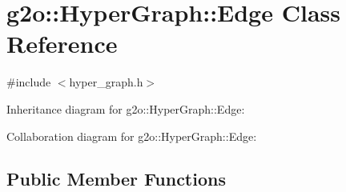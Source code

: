 \hypertarget{classg2o_1_1HyperGraph_1_1Edge}{}\section{g2o\+:\+:Hyper\+Graph\+:\+:Edge Class Reference}
\label{classg2o_1_1HyperGraph_1_1Edge}


{\ttfamily \#include $<$hyper\+\_\+graph.\+h$>$}



Inheritance diagram for g2o\+:\+:Hyper\+Graph\+:\+:Edge\+:


Collaboration diagram for g2o\+:\+:Hyper\+Graph\+:\+:Edge\+:
\subsection*{Public Member Functions}
